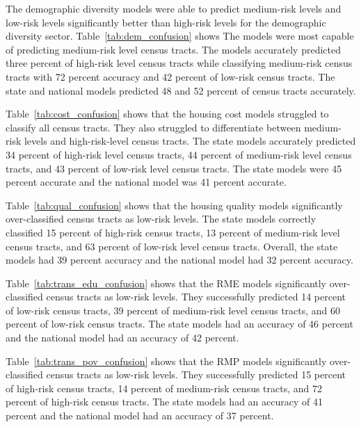  


The demographic diversity models were able to predict medium-risk levels and low-risk levels significantly better than high-risk levels for the demographic diversity sector.  Table~\ref{tab:dem_confusion} shows The models were most capable of predicting medium-risk level census tracts. The models accurately predicted three percent of high-risk level census tracts while classifying medium-risk census tracts with 72 percent accuracy and 42 percent of low-risk census tracts. The state and national models predicted 48 and 52 percent of census tracts accurately. 

 

Table~\ref{tab:cost_confusion} shows that the housing cost models struggled to classify all census tracts. They also struggled to differentiate between medium-risk levels and high-risk-level census tracts. The state models accurately predicted 34 percent of high-risk level census tracts, 44 percent of medium-risk level census tracts, and 43 percent of low-risk level census tracts. The state models were 45 percent accurate and the national model was 41 percent accurate. 

 

Table~\ref{tab:qual_confusion} shows that the housing quality models significantly over-classified census tracts as low-risk levels. The state models correctly classified 15 percent of high-risk census tracts, 13 percent of medium-risk level census tracts, and 63 percent of low-risk level census tracts. Overall, the state models had 39 percent accuracy and the national model had 32 percent accuracy. 

 

Table~\ref{tab:trans_edu_confusion} shows that the  RME models significantly over-classified census tracts as low-risk levels. They successfully predicted 14 percent of low-risk census tracts, 39 percent of medium-risk level census tracts, and  60 percent of low-risk census tracts. The state models had an accuracy of 46 percent and the national model had an accuracy of 42 percent.

 

Table~\ref{tab:trans_pov_confusion} shows that the RMP models significantly over-classified census tracts as low-risk levels. They successfully predicted 15 percent of high-risk census tracts, 14 percent of medium-risk census tracts, and 72 percent of high-risk census tracts. The state models had an accuracy of 41 percent and the national model had an accuracy of 37 percent. 

